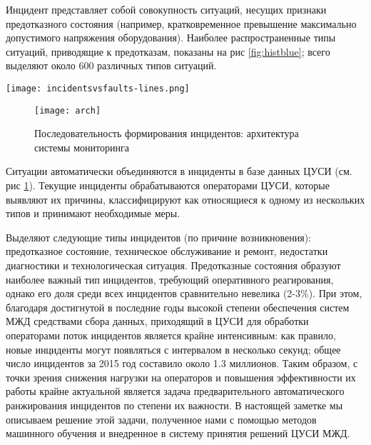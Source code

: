 Инцидент представляет собой совокупность ситуаций, несущих признаки предотказного состояния (например, кратковременное превышение максимально допустимого напряжения оборудования). Наиболее распространенные типы ситуаций, приводящие к предотказам, показаны на рис \ref{fig:histblue}; всего выделяют около 600 различных типов ситуаций. %

\begin{figure*}
\centering
\texttt{[image: incidentsvsfaults-lines.png]}
\caption{Наиболее распространённые типы ситуаций, приводящих к предотказу}
\centering
\label{fig:histblue}
\end{figure*}


\begin{figure}[t]
\centering
\texttt{[image: arch]}
\caption{Последовательность формирования инцидентов: архитектура системы мониторинга}
\centering
\label{fig:arch}
\end{figure}

Ситуации автоматически объединяются в инциденты в базе данных ЦУСИ (см. рис \ref{fig:arch}). Текущие инциденты обрабатываются операторами ЦУСИ, которые выявляют их причины, классифицируют как относящиеся к одному из нескольких типов и принимают необходимые меры. 

Выделяют следующие типы инцидентов (по причине возникновения): предотказное состояние, техническое обслуживание и ремонт, недостатки диагностики и технологическая ситуация. Предотказные состояния образуют наиболее важный тип инцидентов, требующий оперативного реагирования, однако его доля среди всех инцидентов сравнительно невелика (2-3\%). При этом, благодаря достигнутой в последние годы высокой степени обеспечения систем МЖД средствами сбора данных, приходящий в ЦУСИ для обработки операторами поток инцидентов является крайне интенсивным: как правило, новые инциденты могут появляться с интервалом в несколько секунд; общее число инцидентов за 2015 год составило около 1.3 миллионов. 
Таким образом, с точки зрения снижения нагрузки на операторов и повышения эффективности их работы крайне актуальной является задача предварительного автоматического ранжирования инцидентов по степени их важности. В настоящей заметке мы описываем решение этой задачи, полученное нами с помощью методов машинного обучения и внедренное в систему принятия решений ЦУСИ МЖД. 

